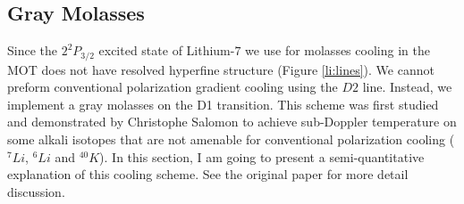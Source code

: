 \subsection{Gray Molasses}\label{theory:gm}

Since the $2^2P_{3/2}$ excited state of Lithium-$7$ we use for molasses cooling in the MOT does not have resolved hyperfine structure (Figure \ref{li:lines}). We cannot preform conventional polarization gradient cooling using the $D2$ line. Instead, we implement a gray molasses on the D1 transition. This scheme was first studied and demonstrated by Christophe Salomon\cite{gm-theory} to achieve sub-Doppler temperature on some alkali isotopes that are not amenable for conventional polarization cooling ($^7Li$, $^6Li$ and $^{40}K$). In this section, I am going to present a semi-quantitative explanation of this cooling scheme. See the original paper\cite{gm-theory} for more detail discussion.\\
